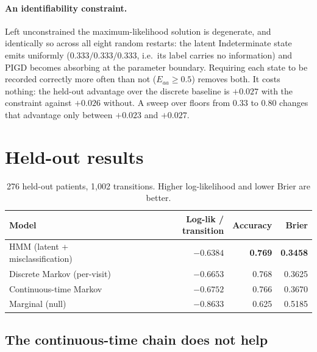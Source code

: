 \documentclass[11pt,a4paper]{article}
\begin{document}
\paragraph{An identifiability constraint.} Left unconstrained the
maximum-likelihood solution is degenerate, and identically so across all eight
random restarts: the latent Indeterminate state emits uniformly
($0.333/0.333/0.333$, i.e.\ its label carries no information) and PIGD becomes
absorbing at the parameter boundary. Requiring each state to be recorded
correctly more often than not ($E_{aa} \geq 0.5$) removes both. It costs
nothing: the held-out advantage over the discrete baseline is $+0.027$ with the
constraint against $+0.026$ without. A sweep over floors from $0.33$ to $0.80$
changes that advantage only between $+0.023$ and $+0.027$.

\section{Held-out results}

\begin{table}[htbp]
\centering
\begin{tabular}{@{}lrrr@{}}
\toprule
\textbf{Model} & \textbf{Log-lik / transition} & \textbf{Accuracy} & \textbf{Brier} \\
\midrule
HMM (latent + misclassification) & \textbf{$-0.6384$} & \textbf{0.769} & \textbf{0.3458} \\
Discrete Markov (per-visit)      & $-0.6653$ & 0.768 & 0.3625 \\
Continuous-time Markov           & $-0.6752$ & 0.766 & 0.3670 \\
Marginal (null)                  & $-0.8633$ & 0.625 & 0.5185 \\
\bottomrule
\end{tabular}
\caption{276 held-out patients, 1{,}002 transitions. Higher log-likelihood and
lower Brier are better.}
\end{table}

\subsection{The continuous-time chain does not help}
\end{document}
